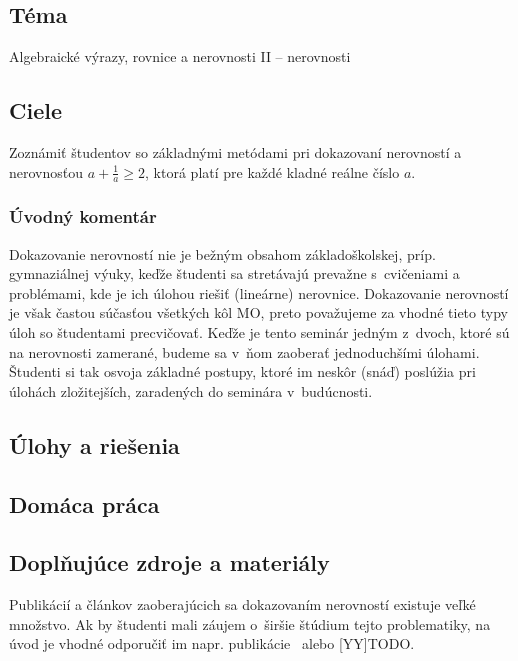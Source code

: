 

\subsection*{Téma}
Algebraické výrazy, rovnice a nerovnosti II -- nerovnosti

\subsection*{Ciele}
Zoznámiť študentov so základnými metódami pri dokazovaní nerovností a nerovnosťou $a+\frac{1}{a}\geq 2$, ktorá platí pre každé kladné reálne číslo $a$.

\subsubsection*{Úvodný komentár}
Dokazovanie nerovností nie je bežným obsahom základoškolskej, príp. gymnaziálnej výuky, keďže študenti sa stretávajú prevažne s~cvičeniami a problémami, kde je ich úlohou riešiť (lineárne) nerovnice. Dokazovanie nerovností je však častou súčasťou všetkých kôl MO, preto považujeme za vhodné tieto typy úloh so študentami precvičovať. Keďže je tento seminár jedným z~dvoch, ktoré sú na nerovnosti zamerané, budeme sa v~ňom zaoberať jednoduchšími úlohami. Študenti si tak osvoja základné postupy, ktoré im neskôr (snáď) poslúžia pri úlohách zložitejších, zaradených do seminára v~budúcnosti.

\subsection*{Úlohy a riešenia}















\subsection*{Domáca práca}

% 

% 

% 


\subsection*{Doplňujúce zdroje a materiály}
Publikácií a článkov zaoberajúcich sa dokazovaním nerovností existuje veľké množstvo. Ak by študenti mali záujem o~širšie štúdium tejto problematiky, na úvod je vhodné odporučiť im napr. publikácie~\cite{bocek1994} alebo [YY]TODO.

